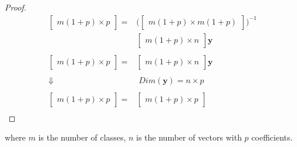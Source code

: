 \begin{proof}
\begin{equation*}
\begin{split}
\begin{bmatrix}
		m (1+p) \times p
	\end{bmatrix}
	= &
	\biggl(\begin{bmatrix}
		m(1+p) \times  m(1+p)
	\end{bmatrix} \biggr)^{-1} \\ &
	\begin{bmatrix}
		m(1+p) \times n 
	\end{bmatrix} \mathbf{y} \\ %
	& \\
	\begin{bmatrix}
		m (1+p) \times p
	\end{bmatrix}
	= &
	\begin{bmatrix}
		m(1+p) \times n 
	\end{bmatrix} \mathbf{y} \\ %
	& \\
	\Downarrow & \; Dim(\mathbf{y}) = n \times p \\ %
	& \\
	\begin{bmatrix}
		m (1+p) \times p
	\end{bmatrix}
	= &
	\begin{bmatrix}
		m(1+p) \times p 
	\end{bmatrix} \\ %
	\end{split}
\end{equation*}
\end{proof}
where $m$ is the number of classes, $n$ is the number of vectors with $p$ coefficients.
